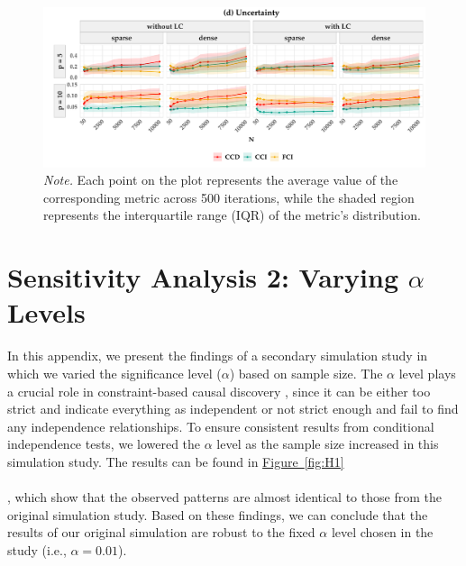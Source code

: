 \documentclass[twoside, 11pt]{article}
\newcommand*{\figref}[2][]{%
  \hyperref[{fig:#2}]{%
    Figure~\ref*{fig:#2}%
    \ifx\\#1\\%
    \else
      #1%
    \fi
  }%
}
\begin{document}
\begin{appendices}
\begin{figure}[H]\ContinuedFloat
    \centering
        \includegraphics[width=1\textwidth]{figures/samplingbeta_unc.pdf}
        \caption*{\small{\textit{Note.} 
        Each point on the plot represents the average value of the corresponding metric across 500 iterations, while the shaded region represents the interquartile range (IQR) of the metric's distribution.}}
\end{figure}    


\newpage
\section{Sensitivity Analysis 2: Varying \texorpdfstring{$\alpha$}{a} Levels}\label{varyingalpha}
In this appendix, we present the findings of a secondary simulation study in which we varied the significance level ($\alpha$) based on sample size. The $\alpha$ level plays a crucial role in constraint-based causal discovery \citep{spirtes2000}, since it can be either too strict and indicate everything as independent or not strict enough and fail to find any independence relationships. To ensure consistent results from conditional independence tests, we lowered the $\alpha$ level as the sample size increased in this simulation study. The results can be found in \figref[]{H1}, which show that the observed patterns are almost identical to those from the original simulation study. Based on these findings, we can conclude that the results of our original simulation are robust to the fixed $\alpha$ level chosen in the study (i.e., $\alpha = 0.01$). 


\vspace{5mm}


\end{appendices}
\end{document}
